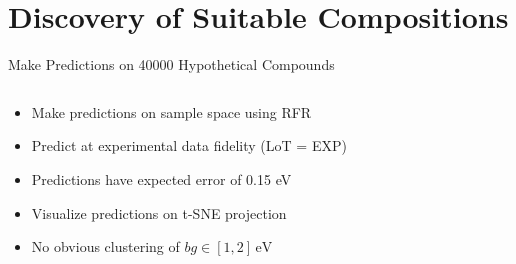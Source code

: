 \documentclass[10pt, aspectratio=169, presentation]{beamer}
\begin{document}
\section{Discovery of Suitable Compositions}
\label{sec:org8c40697}
\begin{frame}[label={sec:org57313ed}]{Make Predictions on \alert{40000} Hypothetical Compounds}
\begin{columns}
\begin{column}{0.4\columnwidth}
\begin{itemize}
\item Make predictions on sample space using RFR
\item Predict at experimental data fidelity (LoT = EXP)
\item Predictions have expected error of 0.15 eV
\item Visualize predictions on t-SNE projection
\item No obvious clustering of \(bg \in [1, 2]\,\si{\electronvolt}\)
\end{itemize}
\end{column}

\begin{column}{0.6\columnwidth}
 
\begin{center}

\end{center}
\end{column}
\end{columns}
\end{frame}
\end{document}
